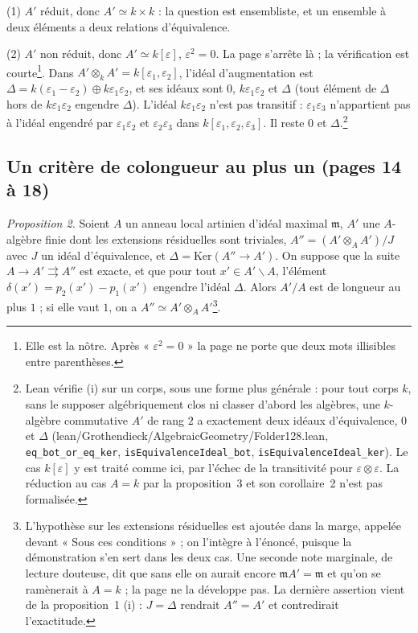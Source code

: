 \documentclass[11pt,a4paper]{article}
\begin{document}
(1) $A'$ réduit, donc $A' \simeq k \times k$ : la question est ensembliste,
et un ensemble à deux éléments a deux relations d'équivalence.

(2) $A'$ non réduit, donc $A' \simeq k[\varepsilon]$, $\varepsilon^2 = 0$.
La page s'arrête là ; la vérification est courte\footnote{Elle est la nôtre.
Après « $\varepsilon^2 = 0$ » la page ne porte que deux mots illisibles entre
parenthèses.}. Dans $A' \otimes_k A' = k[\varepsilon_1, \varepsilon_2]$,
l'idéal d'augmentation est $\Delta = k(\varepsilon_1 - \varepsilon_2) \oplus
k\varepsilon_1\varepsilon_2$, et ses idéaux sont $0$, $k\varepsilon_1
\varepsilon_2$ et $\Delta$ (tout élément de $\Delta$ hors de $k\varepsilon_1
\varepsilon_2$ engendre $\Delta$). L'idéal $k\varepsilon_1\varepsilon_2$
n'est pas transitif : $\varepsilon_1\varepsilon_3$ n'appartient pas à
l'idéal engendré par $\varepsilon_1\varepsilon_2$ et $\varepsilon_2
\varepsilon_3$ dans $k[\varepsilon_1, \varepsilon_2, \varepsilon_3]$. Il
reste $0$ et $\Delta$.\footnote{Lean vérifie (i) sur un corps, sous une forme plus générale : pour tout corps $k$, sans le supposer algébriquement clos ni classer d'abord les algèbres, une $k$-algèbre commutative $A'$ de rang $2$ a exactement deux idéaux d'équivalence, $0$ et $\Delta$ (lean/Grothendieck/AlgebraicGeometry/Folder128.lean, \texttt{eq\_bot\_or\_eq\_ker}, \texttt{isEquivalenceIdeal\_bot}, \texttt{isEquivalenceIdeal\_ker}). Le cas $k[\varepsilon]$ y est traité comme ici, par l'échec de la transitivité pour $\varepsilon \otimes \varepsilon$. La réduction au cas $A = k$ par la proposition~3 et son corollaire~2 n'est pas formalisée.}

\subsection*{Un critère de colongueur au plus un (pages 14 à 18)}

\emph{Proposition 2.} Soient $A$ un anneau local artinien d'idéal maximal
$\mathfrak{m}$, $A'$ une $A$-algèbre finie dont les extensions résiduelles
sont triviales, $A'' = (A' \otimes_A A')/J$ avec $J$ un idéal d'équivalence,
et $\Delta = \mathrm{Ker}(A'' \to A')$. On suppose que la suite $A \to A'
\rightrightarrows A''$ est exacte, et que pour tout $x' \in A' \smallsetminus
A$, l'élément $\delta(x') = p_2(x') - p_1(x')$ engendre l'idéal $\Delta$.
Alors $A'/A$ est de longueur au plus $1$ ; si elle vaut $1$, on a $A''
\simeq A' \otimes_A A'$\footnote{L'hypothèse sur les extensions résiduelles
est ajoutée dans la marge, appelée devant « Sous ces conditions » ; on l'intègre
à l'énoncé, puisque la démonstration s'en sert dans les deux cas. Une seconde
note marginale, de lecture douteuse, dit que sans elle on aurait encore
$\mathfrak{m}A' = \mathfrak{m}$ et qu'on se ramènerait à $A = k$ ; la page ne
la développe pas. La dernière assertion vient de la proposition~1 (i) : $J =
\Delta$ rendrait $A'' = A'$ et contredirait l'exactitude.}.
\end{document}
